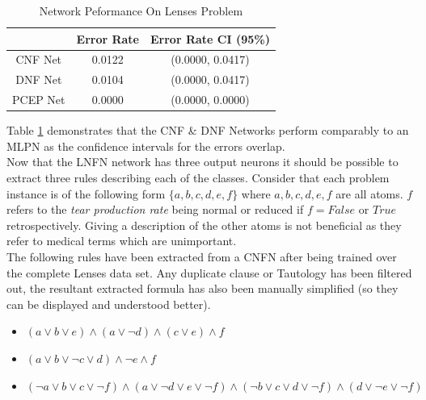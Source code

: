 \begin{table}[H]
	\begin{center}
		\begin{tabular}{| c | c | c |}
			\hline
			& Error Rate & Error Rate CI (95\%) \\
			\hline
			\hline
			CNF Net & 0.0122 & (0.0000, 0.0417) \\
			\hline
			DNF Net & 0.0104 & (0.0000, 0.0417) \\
			\hline
			PCEP Net & 0.0000 & (0.0000, 0.0000) \\
			\hline
		\end{tabular}
	\end{center}
	\caption{Network Peformance On Lenses Problem}
	\label{tab:lenses-peformance-comp}
\end{table}

Table \ref{tab:lenses-peformance-comp} demonstrates that the CNF \& DNF Networks perform comparably to an MLPN as the confidence intervals for the errors overlap.\\ 

Now that the LNFN network has three output neurons it should be possible to extract three rules describing each of the classes. Consider that each problem instance is of the following form $\{a, b, c, d, e, f\}$ where $a,b,c,d,e,f$ are all atoms. $f$ refers to the \textit{tear production rate} being normal or reduced if $f = False$ or $True$ retrospectively. Giving a description of the other atoms is not beneficial as they refer to medical terms which are unimportant.\\

The following rules have been extracted from a CNFN after being trained over the complete Lenses data set. Any duplicate clause or Tautology has been filtered out, the resultant extracted formula has also been manually simplified (so they can be displayed and understood better).

\begin{itemize}
	\item {} $(a \lor b \lor e) \land (a \lor \lnot d) \land (c \lor e) \land f$
	\item {} $(a \lor b \lor \lnot c \lor d) \land \lnot e \land f$
	\item {} $(\lnot a \lor b \lor c \lor \lnot f) \land (a \lor \lnot d \lor e \lor \lnot f) \land (\lnot b \lor c \lor d \lor \lnot f) \land (d \lor \lnot e \lor \lnot f)$
\end{itemize}

